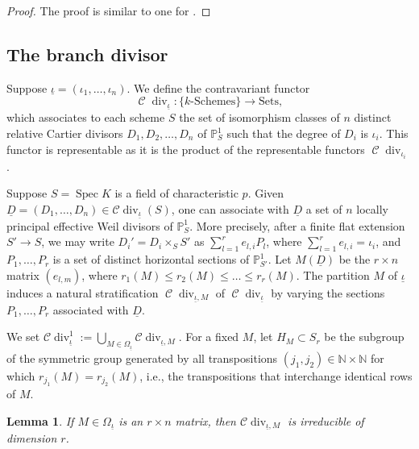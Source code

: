 \documentclass{compositio}
\newcommand{\huy}[1]{\todo[color=yellow]{HD: #1}}
\newtheorem{lemma}[theorem]{Lemma}
\theoremstyle{remark}
\theoremstyle{remark}
\DeclareMathOperator{\spec}{Spec}
\DeclareMathOperator{\divisor}{div}
\DeclareMathOperator{\C}{\mathcal{C}}
\begin{document}
\begin{proof}
The proof is similar to one for \cite[Lemma 3.1]{MR2985514}.
\end{proof}






\subsection{The branch divisor} 

Suppose $\underline{\iota}=(\iota_1, \ldots, \iota_n)$. We define the contravariant functor $$\C\divisor_{\underline{\iota}}: \{  k\text{-Schemes} \} \rightarrow {\text{Sets} },$$which associates to each scheme $S$ the set of isomorphism classes of $n$ distinct relative Cartier divisors $D_1, D_2, \ldots, \allowbreak D_n$ of $\mathbb{P}^1_S$ such that the degree of $D_i$ is $\iota_i$. This functor is representable as it is the product of the representable functors $\C \divisor_{\iota_i}$ \cite{MR2985514}.

Suppose $S=\spec K$ is a field of characteristic $p$. Given $\underline{D}=(D_1, \ldots, D_n) \in \mathcal{C} \divisor_{\underline{\iota}}(S)$, one can associate with $\underline{D}$ a set of $n$ locally principal effective Weil divisors of $\mathbb{P}^1_S$. More precisely, after a finite flat extension $S' \rightarrow S$, we may write $D_i'=D_i \times_S S'$ as $\sum_{l=1}^{r} e_{l,i} P_l$, where $\sum_{l=1}^r e_{l,i} = \iota_i$, and ${P_1, \ldots, P_r }$ is a set of distinct horizontal sections of $\mathbb{P}^1_{S'}$. Let $M(\underline{D})$ be the $r \times n$ matrix $(e_{l,m})$, where $r_1(M) \le r_2(M) \le \ldots \le r_r(M)$. The partition $M$ of $\underline{\iota}$ induces a natural stratification $\C\divisor_{\underline{\iota}, M}$ of $\C\divisor_{\underline{\iota}}$ by varying the sections ${P_1, \ldots, P_r}$ associated with $\underline{D}$.

We set $\mathcal{C} \divisor_{\underline{\iota}}^1:=\bigcup_{M \in \Omega_{\underline{\iota}}} \mathcal{C} \divisor_{\underline{\iota},M}$. For a fixed $M$, let $H_M \subset S_{r}$ be the subgroup of the symmetric group generated by all transpositions $(j_1, j_2) \in \mathbb{N} \times \mathbb{N}$ for which $r_{j_1}(M)=r_{j_2}(M)$, i.e., the transpositions that interchange identical rows of $M$.


\begin{lemma}
\label{lemmadimstratamatrix}
If $M \in \Omega_{\underline{\iota}}$ is an $r \times n$ matrix, then $\mathcal{C}\divisor_{\underline{\iota},M}$ is irreducible of dimension $r$.
\end{lemma}
\end{document}
